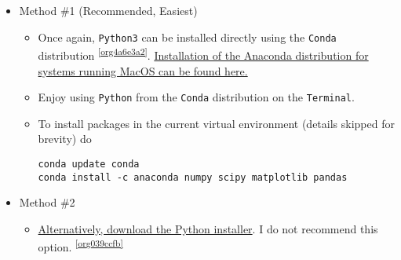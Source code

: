 \documentclass[11pt]{article}
\begin{document}
\begin{itemize}
\item Method \#1 (Recommended, Easiest)
\label{sec:orgf6c4596}
\begin{itemize}
\item Once again, \texttt{Python3} can be installed directly using the \texttt{Conda} distribution \textsuperscript{\ref{org4a6e3a2}}. \href{https://www.anaconda.com/download/\#macos}{Installation of the Anaconda distribution for systems running MacOS can be found here.}
\item Enjoy using \texttt{Python} from the \texttt{Conda} distribution on the \texttt{Terminal}.
\item To install packages in the current virtual environment (details skipped for
brevity) do
\begin{verbatim}
conda update conda
conda install -c anaconda numpy scipy matplotlib pandas
\end{verbatim}
\end{itemize}

\item Method \#2
\label{sec:orgb27d3c0}
\begin{itemize}
\item \href{https://www.python.org/downloads/mac-osx/}{Alternatively, download the Python installer}. I do not recommend this
option. \textsuperscript{\ref{org039ccfb}}
\end{itemize}


\end{itemize}
\end{document}
